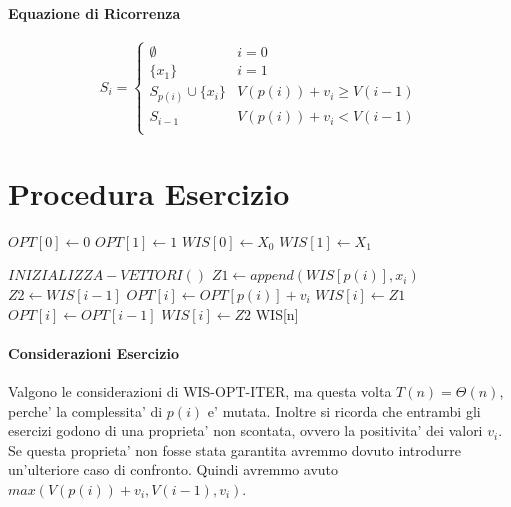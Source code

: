 \paragraph{Equazione di Ricorrenza}

\[
    S_i =
    \begin{cases}
        \text{$\emptyset$} & \text{$i = 0$} \\
        \text{$\{x_1\}$} & \text{$i = 1$} \\
        \text{$S_{p(i)} \cup \{x_i\}$} & \text{$V(p(i)) + v_i \geq V(i-1)$} \\
        \text{$S_{i-1}$} & \text{$V(p(i)) + v_i < V(i-1)$} \\
    \end{cases}
\]

\newpage

\section{Procedura Esercizio}

\begin{algorithm}
    \begin{algorithmic}
            \State $OPT[0] \gets 0$
            \State $OPT[1] \gets 1$
            \State $WIS[0] \gets X_0$
            \State $WIS[1] \gets X_1$
        \EndProcedure
    \end{algorithmic}
\end{algorithm}

\begin{algorithm}
    \begin{algorithmic}
            \State $INIZIALIZZA-VETTORI()$
                \State $Z1 \gets append(WIS[p(i)], x_i)$
                \State $Z2 \gets WIS[i-1]$
                    \State $OPT[i] \gets OPT[p(i)] + v_i$
                    \State $WIS[i] \gets Z1$
                \Else
                    \State $OPT[i] \gets OPT[i-1]$
                    \State $WIS[i] \gets Z2$
                \EndIf
            \EndFor
            \State \Return WIS[n]
        \EndProcedure
    \end{algorithmic}
\end{algorithm}

\paragraph{Considerazioni Esercizio}

Valgono le considerazioni di WIS-OPT-ITER, ma questa volta $T(n) = \Theta(n)$, perche' la complessita' di $p(i)$ e' mutata.
Inoltre si ricorda che entrambi gli esercizi godono di una proprieta' non scontata, ovvero la positivita' dei valori $v_i$.
Se questa proprieta' non fosse stata garantita avremmo dovuto introdurre un'ulteriore caso di confronto.
Quindi avremmo avuto $max(V(p(i)) + v_i, V(i-1), v_i)$.
